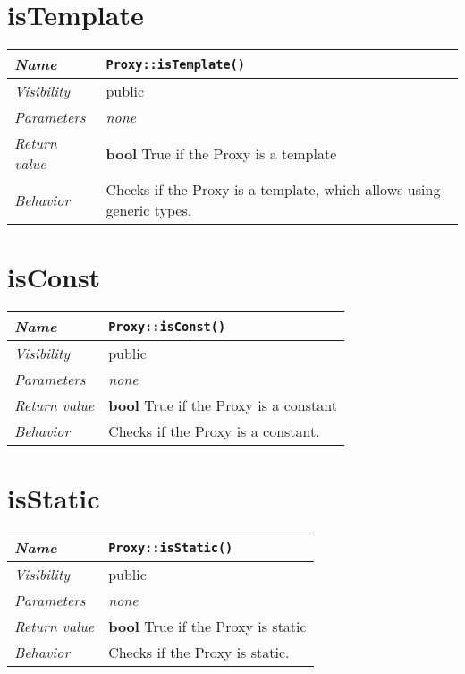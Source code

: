  \section{isTemplate}
\begin{longtable}{p{3cm} @{\hskip 1cm} p{12cm}}
 \hline
\textit{Name} & \texttt{Proxy::isTemplate()}\\
\hline
 \textit{Visibility} & public\\
\hline
\textit{Parameters} & \textit{none}\\
\hline
\textit{Return value} & \textbf{bool} True if the Proxy is a template \\
  \hline
 \textit{Behavior} & Checks if the Proxy is a template, which allows using generic types. \\
\hline
\end{longtable} \pagebreak
 \section{isConst}
\begin{longtable}{p{3cm} @{\hskip 1cm} p{12cm}}
 \hline
\textit{Name} & \texttt{Proxy::isConst()}\\
\hline
 \textit{Visibility} & public\\
\hline
\textit{Parameters} & \textit{none}\\
\hline
\textit{Return value} & \textbf{bool} True if the Proxy is a constant \\
  \hline
 \textit{Behavior} & Checks if the Proxy is a constant. \\
\hline
\end{longtable} \pagebreak
 \section{isStatic}
\begin{longtable}{p{3cm} @{\hskip 1cm} p{12cm}}
 \hline
\textit{Name} & \texttt{Proxy::isStatic()}\\
\hline
 \textit{Visibility} & public\\
\hline
\textit{Parameters} & \textit{none}\\
\hline
\textit{Return value} & \textbf{bool} True if the Proxy is static \\
  \hline
 \textit{Behavior} & Checks if the Proxy is static. \\
\hline
\end{longtable} \pagebreak
